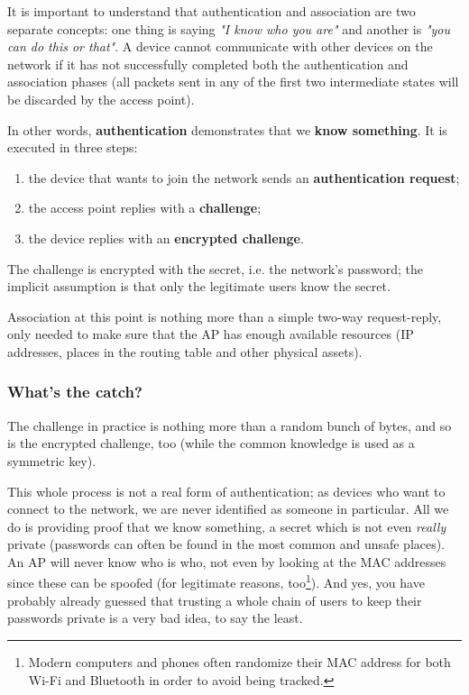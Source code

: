It is important to understand that authentication and association are two separate concepts: one thing is saying \textit{"I know who you are"} and another is \textit{"you can do this or that"}. A device cannot communicate with other devices on the network if it has not successfully completed both the authentication and  association phases (all packets sent in any of the first two intermediate states will be discarded by the access point).

In other words, \textbf{authentication} demonstrates that we \textbf{know something}. It is executed in three steps:

\begin{enumerate}
    \item the device that wants to join the network sends an \textbf{authentication request};
    \item the access point replies with a \textbf{challenge};
    \item the device replies with an \textbf{encrypted challenge}.
\end{enumerate}

The challenge is encrypted with the secret, i.e. the network's password; the implicit assumption is that only the legitimate users know the secret.

Association at this point is nothing more than a simple two-way request-reply, only needed to make sure that the AP has enough available resources (IP addresses, places in the routing table and other physical assets).


\subsubsection*{What's the catch?}
The challenge in practice is nothing more than a random bunch of bytes, and so is the encrypted challenge, too (while the common knowledge is used as a symmetric key).

This whole process is not a real form of authentication; as devices who want to connect to the network, we are never identified as someone in particular. All we do is providing proof that we know something, a secret which is not even \textit{really} private (passwords can often be found in the most common and unsafe places). An AP will never know who is who, not even by looking at the MAC addresses since these can be spoofed (for legitimate reasons, too\footnote{Modern computers and phones often randomize their MAC address for both Wi-Fi and Bluetooth in order to avoid being tracked.}). And yes, you have probably already guessed that trusting a whole chain of users to keep their passwords private is a very bad idea, to say the least.

